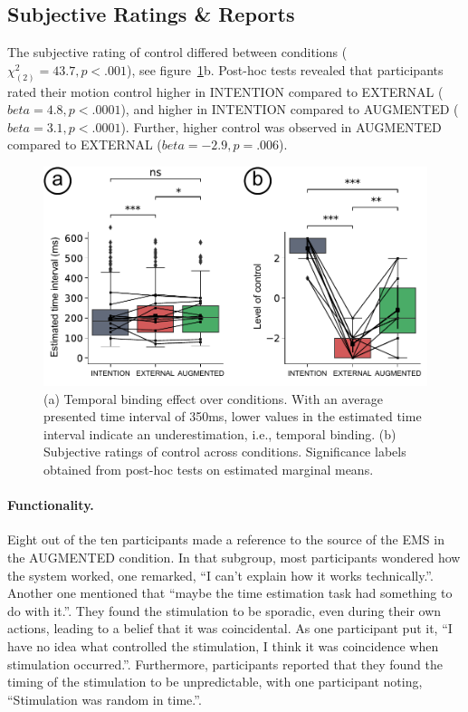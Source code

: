 \subsection{Subjective Ratings \& Reports}
The subjective rating of control differed between conditions (${\chi^{2}_{(2)}} = 43.7, p < .001$), see figure~\ref{fig:results}b. Post-hoc tests revealed that participants rated their motion control higher in INTENTION compared to EXTERNAL ($beta = 4.8, p < .0001$), and higher in INTENTION compared to AUGMENTED ($beta = 3.1, p < .0001$). Further, higher control was observed in AUGMENTED compared to EXTERNAL ($beta = -2.9, p = .006$).

\begin{figure}[h]
    \centering
    \includegraphics[width=\columnwidth]{figures/subjective_results.pdf}
    \caption{(a) Temporal binding effect over conditions. With an average presented time interval of 350ms, lower values in the estimated time interval indicate an underestimation, i.e., temporal binding. (b) Subjective ratings of control across conditions. Significance labels obtained from post-hoc tests on estimated marginal means.}
    \label{fig:results}
\end{figure}

\paragraph{Functionality.} Eight out of the ten participants made a reference to the source of the EMS in the AUGMENTED condition. In that subgroup, most participants wondered how the system worked, one remarked, ``I can't explain how it works technically.''. Another one mentioned that ``maybe the time estimation task had something to do with it.''. They found the stimulation to be sporadic, even during their own actions, leading to a belief that it was coincidental. As one participant put it, ``I have no idea what controlled the stimulation, I think it was coincidence when stimulation occurred.''. Furthermore, participants reported that they found the timing of the stimulation to be unpredictable, with one participant noting, ``Stimulation was random in time.''. 

